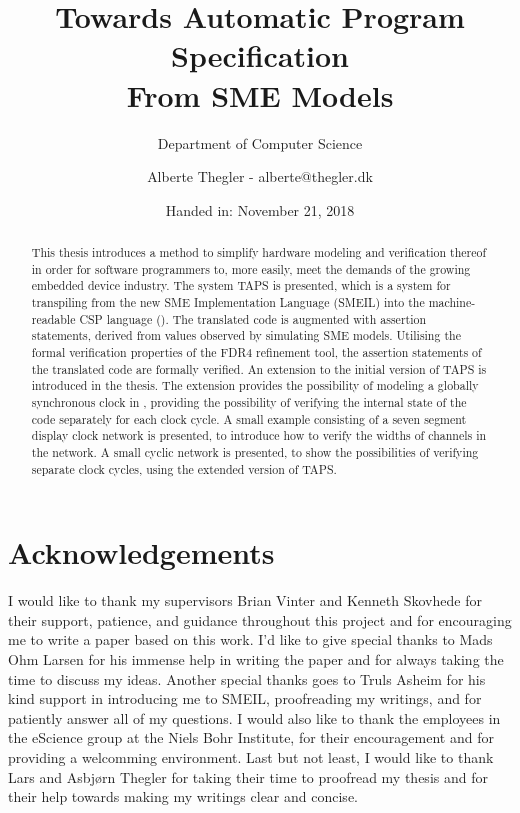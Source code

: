 \documentclass[a4paper]{report}
\author{Alberte Thegler - alberte@thegler.dk}
\title{Towards Automatic Program Specification \\ From SME Models}
\subtitle{Department of Computer Science}
\date{Handed in: November 21, 2018}
\begin{document}
\maketitle



\begin{abstract}
\begin{doublespace}
This thesis introduces a method to simplify hardware modeling and verification
thereof in order for software programmers to, more easily, meet the demands of
the growing embedded device industry. The system TAPS is presented, which is a
system for transpiling from the new SME Implementation Language (SMEIL) into the
machine-readable CSP language (\cspm{}).
The translated \cspm{} code is augmented with assertion statements, derived from values observed by simulating SME models. Utilising the formal verification
properties of the FDR4 refinement tool, the assertion statements of the
translated \cspm{} code are formally verified.
An extension to the initial version of TAPS is introduced in the thesis. The extension provides the possibility of modeling a globally synchronous clock in
\cspm{}, providing the possibility of verifying the internal state of the
\cspm{} code separately for each clock cycle.
A small example consisting of a
seven segment display clock network is presented, to introduce how to verify the
widths of channels in the network. A small cyclic network is presented, to
show the possibilities of verifying separate clock cycles, using the extended
version of TAPS.
\end{doublespace}
\end{abstract}

\chapter*{Acknowledgements}
I would like to thank my supervisors Brian Vinter and Kenneth Skovhede for their support, patience, and guidance throughout this project and for encouraging me to write a paper based on this work.
I'd like to give special thanks to Mads Ohm Larsen for his immense help in writing the paper and for always taking the time to discuss my ideas.
Another special thanks goes to Truls Asheim for his kind support in introducing me to SMEIL, proofreading my writings, and for patiently answer all of my questions.
I would also like to thank the employees in the eScience group at the Niels Bohr Institute, for their encouragement and for providing a welcomming environment.
Last but not least, I would like to thank Lars and Asbj\o rn Thegler for taking their time to proofread my thesis and for their help towards making my writings clear and concise.
\end{document}
